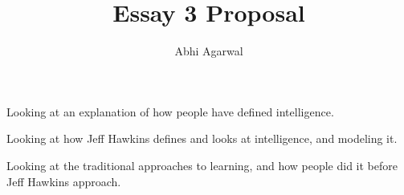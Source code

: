 \documentclass[11pt, oneside]{article}
\title{Essay 3 Proposal}
\author{Abhi Agarwal}
\date{}
\begin{document}
\maketitle

\par Looking at an explanation of how people have defined intelligence.
\par Looking at how Jeff Hawkins defines and looks at intelligence, and modeling it.
\par Looking at the traditional approaches to learning, and how people did it before Jeff Hawkins approach.
\end{document}

